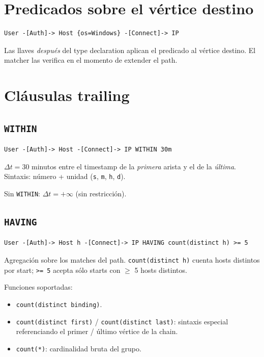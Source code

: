 \section{Predicados sobre el vértice destino}

\begin{lstlisting}
User -[Auth]-> Host {os=Windows} -[Connect]-> IP
\end{lstlisting}

\noindent
Las llaves \emph{después} del type declaration aplican el predicado
al vértice destino. El matcher las verifica en el momento de
extender el path.

\section{Cláusulas trailing}

\subsection{\texttt{WITHIN}}

\begin{lstlisting}
User -[Auth]-> Host -[Connect]-> IP WITHIN 30m
\end{lstlisting}

\noindent
\(\Delta t = 30\) minutos entre el timestamp de la \emph{primera}
arista y el de la \emph{última}. Sintaxis: número + unidad
(\texttt{s}, \texttt{m}, \texttt{h}, \texttt{d}).

Sin \texttt{WITHIN}: \(\Delta t = +\infty\) (sin restricción).

\subsection{\texttt{HAVING}}

\begin{lstlisting}
User -[Auth]-> Host h -[Connect]-> IP HAVING count(distinct h) >= 5
\end{lstlisting}

\noindent
Agregación sobre los matches del path. \texttt{count(distinct h)}
cuenta hosts distintos por start; \texttt{>= 5} acepta sólo starts
con $\geq$ 5 hosts distintos.

Funciones soportadas:
\begin{itemize}
    \item \texttt{count(distinct binding)}.
    \item \texttt{count(distinct first)} / \texttt{count(distinct last)}:
    sintaxis especial referenciando el primer / último vértice de la
    chain.
    \item \texttt{count(*)}: cardinalidad bruta del grupo.
\end{itemize}


